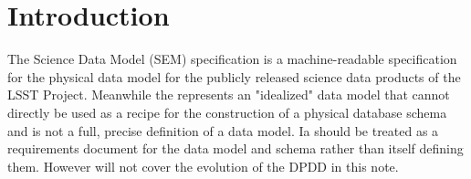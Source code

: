 
\section{Introduction}

The Science Data Model (SEM) specification is a machine-readable specification for the physical data model for the publicly released science data products of the LSST Project.
Meanwhile the \DPDD  represents an "idealized" data model that cannot directly be used as a recipe for the construction of a physical database schema and is not a full, precise definition of a data model.
Ia should be treated as a requirements document for the data model and schema rather than itself defining them. However will not cover the evolution of the DPDD in this note.



